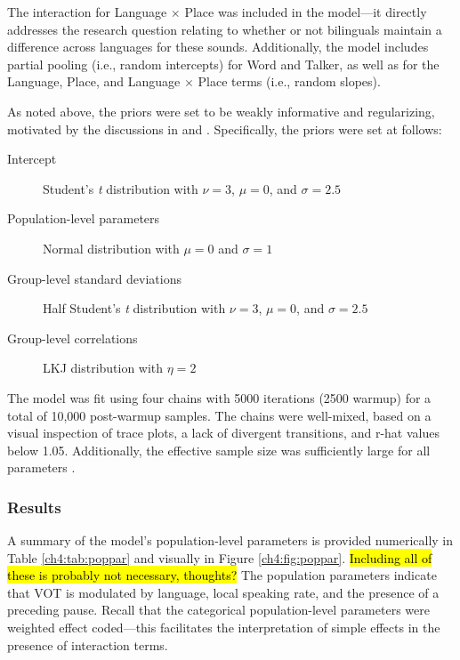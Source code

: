 The interaction for Language $\times$ Place was included in the model---it directly addresses the research question relating to whether or not bilinguals maintain a difference across languages for these sounds. Additionally, the model includes partial pooling (i.e., random intercepts) for Word and Talker, as well as for the Language, Place, and Language $\times$ Place terms (i.e., random slopes). 

As noted above, the priors were set to be weakly informative and regularizing, motivated by the discussions in \citet{gelman_2017_prior} and \citet{mcelreath_2020_sr}. Specifically, the priors were set at follows: 

\begin{description}
	\item[Intercept] Student's \textit{t} distribution with $\nu = 3$, $\mu = 0$, and $\sigma = 2.5$
	\item[Population-level parameters] Normal distribution with $\mu = 0$ and $\sigma = 1$
	\item[Group-level standard deviations] Half Student's \textit{t} distribution with $\nu = 3$, $\mu = 0$, and $\sigma = 2.5$
	\item[Group-level correlations] LKJ distribution with $\eta=2$
\end{description}

The model was fit using four chains with 5000 iterations (2500 warmup) for a total of 10,000 post-warmup samples. The chains were well-mixed, based on a visual inspection of trace plots, a lack of divergent transitions, and r-hat values below 1.05. Additionally, the effective sample size was sufficiently large for all parameters \citep[for discussion, see][]{vasishth_2018_bayesian}.

\subsubsection{Results}\label{ch4:sec:results}

A summary of the model's population-level parameters is provided numerically in Table \ref{ch4:tab:poppar} and visually in Figure \ref{ch4:fig:poppar}. \hl{Including all of these is probably not necessary, thoughts?} The population parameters indicate that VOT is modulated by language, local speaking rate, and the presence of a preceding pause. Recall that the categorical population-level parameters were weighted effect coded---this facilitates the interpretation of simple effects in the presence of interaction terms.

